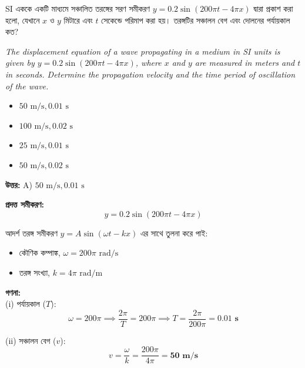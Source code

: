 \documentclass[12pt, a4paper]{article}
\begin{document}
\newpage

\begin{tcolorbox}[questionbox={প্রশ্ন (Question) 1}]
    \noindent
    SI এককে একটি মাধ্যমে সঞ্চালিত তরঙ্গের সরণ সমীকরণ $y = 0.2 \sin(200\pi t - 4\pi x)$ দ্বারা প্রকাশ করা হলো, যেখানে $x$ ও $y$ মিটারে এবং $t$ সেকেন্ডে পরিমাপ করা হয়। তরঙ্গটির সঞ্চালন বেগ এবং দোলনের পর্যায়কাল কত?
    
    \vspace{0.8em}
    \begin{english}
    \noindent\textit{\color{darkgray}
    The displacement equation of a wave propagating in a medium in SI units is given by $y = 0.2 \sin(200\pi t - 4\pi x)$, where $x$ and $y$ are measured in meters and $t$ in seconds. Determine the propagation velocity and the time period of oscillation of the wave.
    }
    \end{english}
\end{tcolorbox}

\begin{itemize}[label={}, leftmargin=1cm, itemsep=0.5em]
    \item[\textbf{A)}] $50\text{ m/s}, 0.01\text{ s}$
    \item[\textbf{B)}] $100\text{ m/s}, 0.02\text{ s}$
    \item[\textbf{C)}] $25\text{ m/s}, 0.01\text{ s}$
    \item[\textbf{D)}] $50\text{ m/s}, 0.02\text{ s}$
\end{itemize}

\vspace{0.5em}
\begin{tcolorbox}[answerbox]
    \textbf{\color{success} উত্তর:} A) $50\text{ m/s}, 0.01\text{ s}$
\end{tcolorbox}
\vspace{1em}

\begin{tcolorbox}[solutionbox={সমাধান (Solution)}]
    \noindent
    \textbf{প্রদত্ত সমীকরণ:}
    \[ y = 0.2 \sin(200\pi t - 4\pi x) \]
    
    আদর্শ তরঙ্গ সমীকরণ $y = A \sin(\omega t - kx)$ এর সাথে তুলনা করে পাই:
    \begin{itemize}[leftmargin=1.5em, itemsep=0.2em]
        \item কৌণিক কম্পাঙ্ক, $\omega = 200\pi\text{ rad/s}$
        \item তরঙ্গ সংখ্যা, $k = 4\pi\text{ rad/m}$
    \end{itemize}

    \vspace{0.6em}
    \noindent\textbf{গণনা:} \\
    (i) পর্যায়কাল ($T$):
    \[ \omega = 200\pi \implies \frac{2\pi}{T} = 200\pi \implies T = \frac{2\pi}{200\pi} = \mathbf{0.01\text{ s}} \]
    
    (ii) সঞ্চালন বেগ ($v$):
    \[ v = \frac{\omega}{k} = \frac{200\pi}{4\pi} = \mathbf{50\text{ m/s}} \]
\end{tcolorbox}
\end{document}
